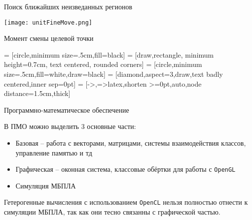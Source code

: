 \begin{tslide}{Поиск ближайших неизведанных регионов}

    \vfill

    \begin{center}
    \texttt{[image: unitFineMove.png]}
    \end{center}

    \vfill

\end{tslide}

\begin{tslide}{Момент смены целевой точки}

     = [circle,minimum size=.5cm,fill=black]
     = [draw,rectangle, minimum height=0.7cm,
                text centered, rounded corners]
     = [circle,minimum size=.5cm,fill=white,draw=black]
     = [diamond,aspect=3,draw,text badly centered,inner sep=0pt]
     = [->,=>latex,shorten >=0pt,auto,node distance=1.5cm,thick]

    \centering

\end{tslide}

\begin{tslide}{Программно-математическое обеспечение}

    В ПМО можно выделить 3 основные части:
    \begin{itemize}
        \item Базовая -- работа с векторами, матрицами, системы
    взаимодействия классов, управление памятью и тд

        \item Графическая -- оконная система, классовые обёртки
            для работы с \verb|OpenGL|

        \item Симуляция МБПЛА
    \end{itemize}

    Гетерогенные вычисления с использованием \verb|OpenCL| нельзя
    полностью отнести к симуляции МБПЛА, так как они тесно связанны
    с графической частью.

\end{tslide}

